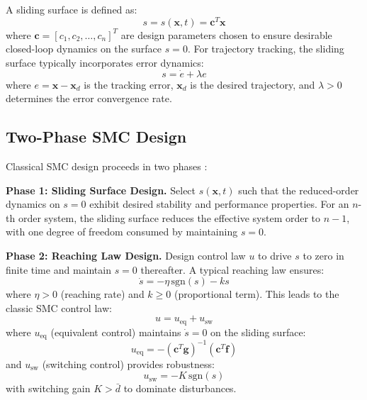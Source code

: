 A sliding surface is defined as:
\begin{equation}
s = s(\mathbf{x}, t) = \mathbf{c}^T \mathbf{x}
\label{eq:sliding_surface_linear}
\end{equation}
where $\mathbf{c} = [c_1, c_2, \ldots, c_n]^T$ are design parameters chosen to ensure desirable closed-loop dynamics on the surface $s = 0$. For trajectory tracking, the sliding surface typically incorporates error dynamics:
\begin{equation}
s = \dot{e} + \lambda e
\label{eq:sliding_surface_tracking}
\end{equation}
where $e = \mathbf{x} - \mathbf{x}_d$ is the tracking error, $\mathbf{x}_d$ is the desired trajectory, and $\lambda > 0$ determines the error convergence rate.

\subsection{Two-Phase SMC Design}

Classical SMC design proceeds in two phases \cite{slotine1991applied,edwards1998sliding}:

\textbf{Phase 1: Sliding Surface Design.} Select $s(\mathbf{x}, t)$ such that the reduced-order dynamics on $s = 0$ exhibit desired stability and performance properties. For an $n$-th order system, the sliding surface reduces the effective system order to $n-1$, with one degree of freedom consumed by maintaining $s = 0$.

\textbf{Phase 2: Reaching Law Design.} Design control law $u$ to drive $s$ to zero in finite time and maintain $s = 0$ thereafter. A typical reaching law ensures:
\begin{equation}
\dot{s} = -\eta \, \text{sgn}(s) - k s
\label{eq:reaching_law}
\end{equation}
where $\eta > 0$ (reaching rate) and $k \geq 0$ (proportional term). This leads to the classic SMC control law:
\begin{equation}
u = u_{\text{eq}} + u_{\text{sw}}
\label{eq:smc_control_law}
\end{equation}
where $u_{\text{eq}}$ (equivalent control) maintains $\dot{s} = 0$ on the sliding surface:
\begin{equation}
u_{\text{eq}} = -(\mathbf{c}^T \mathbf{g})^{-1} (\mathbf{c}^T \mathbf{f})
\label{eq:equivalent_control}
\end{equation}
and $u_{\text{sw}}$ (switching control) provides robustness:
\begin{equation}
u_{\text{sw}} = -K \, \text{sgn}(s)
\label{eq:switching_control}
\end{equation}
with switching gain $K > \bar{d}$ to dominate disturbances.

